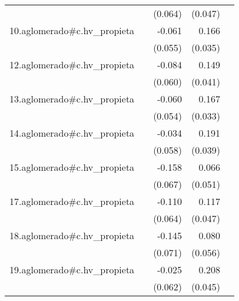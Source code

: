 {\begin{longtable}{l*{4}{D{.}{.}{-1}}}
            &                     &     (0.064)         &     (0.047)         &                     \\
\addlinespace
10.aglomerado#c.hv\_propieta&                     &      -0.061         &       0.166\sym{***}&                     \\
            &                     &     (0.055)         &     (0.035)         &                     \\
\addlinespace
12.aglomerado#c.hv\_propieta&                     &      -0.084         &       0.149\sym{***}&                     \\
            &                     &     (0.060)         &     (0.041)         &                     \\
\addlinespace
13.aglomerado#c.hv\_propieta&                     &      -0.060         &       0.167\sym{***}&                     \\
            &                     &     (0.054)         &     (0.033)         &                     \\
\addlinespace
14.aglomerado#c.hv\_propieta&                     &      -0.034         &       0.191\sym{***}&                     \\
            &                     &     (0.058)         &     (0.039)         &                     \\
\addlinespace
15.aglomerado#c.hv\_propieta&                     &      -0.158\sym{*}  &       0.066         &                     \\
            &                     &     (0.067)         &     (0.051)         &                     \\
\addlinespace
17.aglomerado#c.hv\_propieta&                     &      -0.110         &       0.117\sym{*}  &                     \\
            &                     &     (0.064)         &     (0.047)         &                     \\
\addlinespace
18.aglomerado#c.hv\_propieta&                     &      -0.145\sym{*}  &       0.080         &                     \\
            &                     &     (0.071)         &     (0.056)         &                     \\
\addlinespace
19.aglomerado#c.hv\_propieta&                     &      -0.025         &       0.208\sym{***}&                     \\
            &                     &     (0.062)         &     (0.045)         &                     \\

\end{longtable}}
